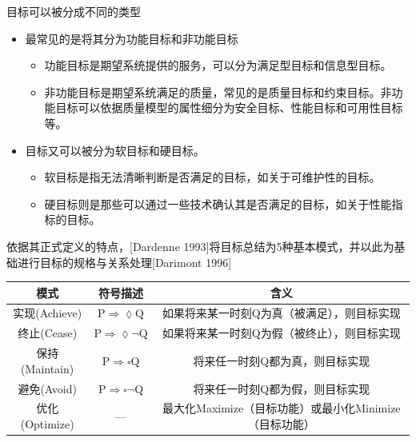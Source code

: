 目标可以被分成不同的类型
\begin{itemize}
    \item 最常见的是将其分为功能目标和非功能目标
    \begin{itemize}
        \item 功能目标是期望系统提供的服务，可以分为满足型目标和信息型目标。
        \item 非功能目标是期望系统满足的质量，常见的是质量目标和约束目标。非功能目标可以依据质量模型的属性细分为安全目标、性能目标和可用性目标等。
    \end{itemize}
    \item 目标又可以被分为软目标和硬目标。
    \begin{itemize}
        \item 软目标是指无法清晰判断是否满足的目标，如关于可维护性的目标。
        \item 硬目标则是那些可以通过一些技术确认其是否满足的目标，如关于性能指标的目标。
    \end{itemize}
\end{itemize}


依据其正式定义的特点，[Dardenne 1993]将目标总结为5种基本模式，并以此为基础进行目标的规格与关系处理[Darimont 1996]
\vspace{-0.5em}
\begin{table}[H]
    \centering
    \begin{tabular}{|c|c|c|}
        \hline
        模式  &	符号描述  &	含义 \\\hline
        实现(Achieve) & $\mathrm{P} \Rightarrow \lozenge \mathrm{Q}$ & 如果将来某一时刻Q为真（被满足），则目标实现 \\\hline
        终止(Cease) & $\mathrm{P} \Rightarrow \lozenge \lnot \mathrm{Q}$ & 如果将来某一时刻Q为假（被终止），则目标实现 \\\hline
        保持(Maintain) & $\mathrm{P} \Rightarrow \square \mathrm{Q}$ & 将来任一时刻Q都为真，则目标实现 \\\hline
        避免(Avoid) & $\mathrm{P} \Rightarrow \square \lnot \mathrm{Q}$ & 将来任一时刻Q都为假，则目标实现 \\\hline
        优化(Optimize) & — & 最大化Maximize（目标功能）或最小化Minimize（目标功能）\\\hline
    \end{tabular}
\end{table}
\vspace{-1em}

